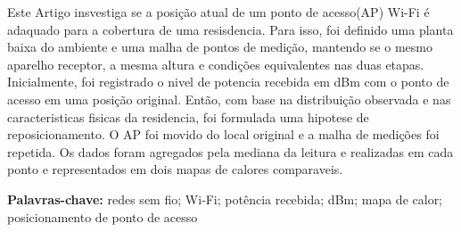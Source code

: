 Este Artigo insvestiga se a posição atual de um ponto de acesso(AP) Wi-Fi é adaquado para a cobertura de uma resisdencia. Para isso, foi definido uma planta baixa do ambiente e uma malha de pontos de medição, mantendo se o mesmo aparelho receptor, a mesma altura e condições equivalentes nas duas etapas. Inicialmente, foi registrado o nivel de potencia recebida em dBm com o ponto de acesso em uma posição original. Então, com base na distribuição observada e nas caracteristicas fisicas da residencia, foi formulada uma hipotese de reposicionamento. O AP foi movido do local original e a malha de medições foi repetida.
Os dados foram agregados pela mediana da leitura e realizadas em cada ponto e representados em dois mapas de calores comparaveis.
\medskip

\noindent \textbf{Palavras-chave:}  redes sem fio; Wi‐Fi; potência recebida; dBm; mapa de calor; posicionamento
de ponto de acesso \bigskip